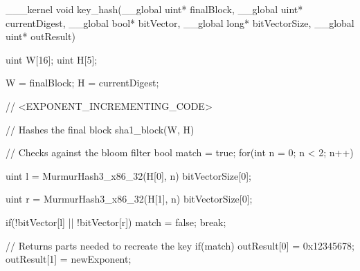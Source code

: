 
\begin{adjustbox}{width=\textwidth,height=15cm,keepaspectratio}
  \centering
  \begin{Code}[OpenCLStyle]
  ___kernel void key_hash(__global uint* finalBlock, 
                       __global uint* currentDigest, 
                       __global bool* bitVector, 
                       __global long* bitVectorSize, 
                       __global uint* outResult)
  {
    uint W[16];
    uint H[5];

    W = finalBlock;
    H = currentDigest;

    // <EXPONENT_INCREMENTING_CODE>
  
    // Hashes the final block
    sha1_block(W, H)
  
    // Checks against the bloom filter
    bool match = true;
    for(int n = 0; n < 2; n++)
    {		
      uint l = MurmurHash3_x86_32(H[0], n) %
              bitVectorSize[0];

      uint r = MurmurHash3_x86_32(H[1], n) %
              bitVectorSize[0];
  
      if(!bitVector[l] || !bitVector[r])
      {
        match = false;
        break;
      }
    }
  
    // Returns parts needed to recreate the key
    if(match)
    {
      outResult[0] = 0x12345678;
      outResult[1] = newExponent;
    }
  }
  \end{Code}
\end{adjustbox}